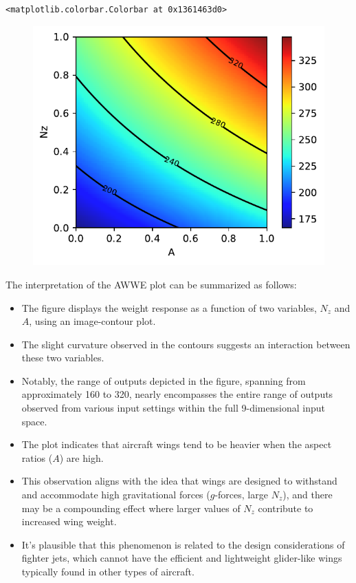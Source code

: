 \documentclass[
  letterpaper,
  DIV=11,
  numbers=noendperiod]{scrreprt}
\providecommand{\tightlist}{%
  \setlength{\itemsep}{0pt}\setlength{\parskip}{0pt}}\usepackage{longtable,booktabs,array}
\begin{document}
\begin{verbatim}
<matplotlib.colorbar.Colorbar at 0x1361463d0>
\end{verbatim}

\begin{figure}[H]

{\centering \includegraphics{002_awwe_files/figure-pdf/cell-6-output-2.pdf}

}

\end{figure}

The interpretation of the AWWE plot can be summarized as follows:

\begin{itemize}
\tightlist
\item
  The figure displays the weight response as a function of two
  variables, \(N_z\) and \(A\), using an image-contour plot.
\item
  The slight curvature observed in the contours suggests an interaction
  between these two variables.
\item
  Notably, the range of outputs depicted in the figure, spanning from
  approximately 160 to 320, nearly encompasses the entire range of
  outputs observed from various input settings within the full
  9-dimensional input space.
\item
  The plot indicates that aircraft wings tend to be heavier when the
  aspect ratios (\(A\)) are high.
\item
  This observation aligns with the idea that wings are designed to
  withstand and accommodate high gravitational forces (\(g\)-forces,
  large \(N_z\)), and there may be a compounding effect where larger
  values of \(N_z\) contribute to increased wing weight.
\item
  It's plausible that this phenomenon is related to the design
  considerations of fighter jets, which cannot have the efficient and
  lightweight glider-like wings typically found in other types of
  aircraft.
\end{itemize}
\end{document}
